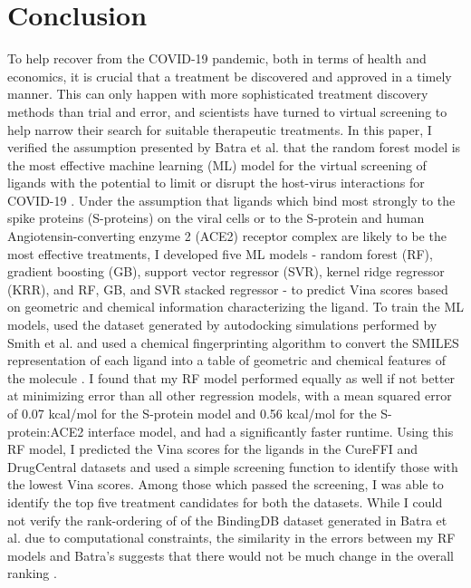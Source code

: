 \documentclass[11pt]{article}
\begin{document}
  \section{Conclusion}
  To help recover from the COVID-19 pandemic, both in terms of health and economics, it is crucial that a treatment be discovered and approved in a timely manner. This can only happen with more sophisticated treatment discovery methods than trial and error, and scientists have turned to virtual screening to help narrow their search for suitable therapeutic treatments. In this paper, I verified the assumption presented by Batra et al. that the random forest model is the most effective machine learning (ML) model for the virtual screening of ligands with the potential to limit or disrupt the host-virus interactions for COVID-19 \cite{batra}. Under the assumption that ligands which bind most strongly to the spike proteins (S-proteins) on the viral cells or to the S-protein and human Angiotensin-converting enzyme 2 (ACE2) receptor complex are likely to be the most effective treatments, I developed five ML models - random forest (RF), gradient boosting (GB), support vector regressor (SVR), kernel ridge regressor (KRR), and RF, GB, and SVR stacked regressor - to predict Vina scores based on  geometric and chemical information characterizing the ligand. To train the ML models, used the dataset generated by autodocking simulations  performed by Smith et al. and used a chemical fingerprinting algorithm to convert the SMILES representation of each ligand into a table of geometric and chemical features of the molecule \cite{schwartz,smith}. I found that my RF model performed equally as well if not better at minimizing error than all other regression models, with a mean squared error of 0.07 kcal/mol for the S-protein model and 0.56 kcal/mol for the S-protein:ACE2 interface model, and had a significantly faster runtime. Using this RF model, I predicted the Vina scores for the ligands in the CureFFI and DrugCentral datasets and used a simple screening function to identify those with the lowest Vina scores. Among those which passed the screening, I was able to identify the top five treatment candidates for both the datasets. While I could not verify the rank-ordering of of the BindingDB dataset generated in Batra et al. due to computational constraints, the similarity in the errors between my RF models and Batra's suggests that there would not be much change in the overall ranking \cite{batra,cureffi,bindingdb,drugcentral}.
  
   \newpage
    
\end{document}
